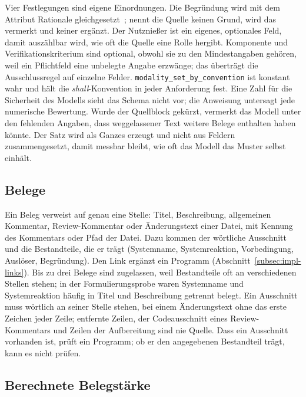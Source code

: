 \documentclass[11pt,a4paper]{report}
\begin{document}
Vier Festlegungen sind eigene Einordnungen. Die Begründung wird mit dem
Attribut Rationale gleichgesetzt~\cite[Abschn.~5.2.8.2]{iso29148}; nennt
die Quelle keinen Grund, wird das vermerkt und keiner ergänzt. Der
Nutznießer ist ein eigenes, optionales Feld, damit auszählbar wird, wie
oft die Quelle eine Rolle hergibt. Komponente und Verifikationskriterium
sind optional, obwohl sie zu den Mindestangaben gehören, weil ein
Pflichtfeld eine unbelegte Angabe erzwänge; das überträgt die
Ausschlussregel auf einzelne Felder. \texttt{modality\_set\_by\_convention}
ist konstant wahr und hält die \emph{shall}-Konvention in jeder
Anforderung fest. Eine Zahl für die Sicherheit des Modells sieht das
Schema nicht vor; die Anweisung untersagt jede numerische Bewertung.
Wurde der Quellblock gekürzt, vermerkt das Modell unter den fehlenden
Angaben, dass weggelassener Text weitere Belege enthalten haben könnte.
Der Satz wird als Ganzes erzeugt und nicht aus Feldern zusammengesetzt,
damit messbar bleibt, wie oft das Modell das Muster selbst einhält.

\subsection{Belege}
\label{subsec:datenmodell-belege}

Ein Beleg verweist auf genau eine Stelle: Titel, Beschreibung,
allgemeinen Kommentar, Review-Kommentar oder Änderungstext einer Datei,
mit Kennung des Kommentars oder Pfad der Datei. Dazu kommen der
wörtliche Ausschnitt und die Bestandteile, die er trägt (Systemname,
Systemreaktion, Vorbedingung, Auslöser, Begründung). Den Link ergänzt
ein Programm (Abschnitt~\ref{subsec:impl-links}). Bis zu drei Belege
sind zugelassen, weil Bestandteile oft an verschiedenen Stellen stehen;
in der Formulierungsprobe waren Systemname und Systemreaktion häufig in
Titel und Beschreibung getrennt belegt. Ein Ausschnitt muss wörtlich an
seiner Stelle stehen, bei einem Änderungstext ohne das erste Zeichen
jeder Zeile; entfernte Zeilen, der Codeausschnitt eines Review-Kommentars
und Zeilen der Aufbereitung sind nie Quelle. Dass ein Ausschnitt
vorhanden ist, prüft ein Programm; ob er den angegebenen Bestandteil
trägt, kann es nicht prüfen.

\subsection{Berechnete Belegstärke}
\label{subsec:datenmodell-belegstaerke}
\label{subsec:belegregeln}
\end{document}

